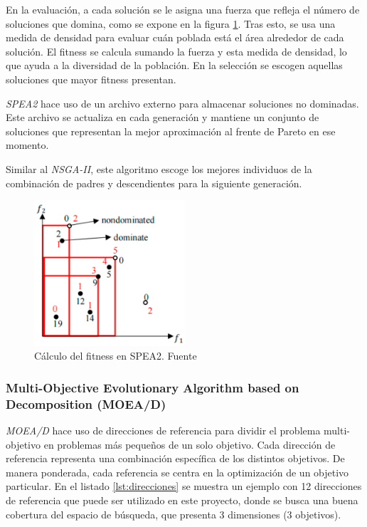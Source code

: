 En la evaluación, a cada solución se le asigna una fuerza que refleja el número de soluciones que domina, como se expone en la figura \ref{fig:spea2}. Tras esto, se usa una medida de densidad para evaluar cuán poblada está el área alrededor de cada solución. El fitness se calcula sumando la fuerza y esta medida de densidad, lo que ayuda a la diversidad de la población. En la selección se escogen aquellas soluciones que mayor fitness presentan.

\textit{SPEA2} hace uso de un archivo externo para almacenar soluciones no dominadas. Este archivo se actualiza en cada generación y mantiene un conjunto de soluciones que representan la mejor aproximación al frente de Pareto en ese momento.

Similar al \textit{NSGA-II}, este algoritmo escoge los mejores individuos de la combinación de padres y descendientes para la siguiente generación.~\cite{pymoo_spea2}

\begin{figure}[H]
  \centering
  \includegraphics[width=0.5\textwidth]{figures/spea2.png}
  \caption{Cálculo del fitness en SPEA2. Fuente \cite{spea2_imagen}}
  \label{fig:spea2}
\end{figure}
\newpage
\subsubsection{Multi-Objective Evolutionary Algorithm based on Decomposition (MOEA/D)}
\label{ch:moead}

\textit{MOEA/D} hace uso de direcciones de referencia para dividir el problema multi-objetivo en problemas más pequeños de un solo objetivo. Cada dirección de referencia representa una combinación específica de los distintos objetivos. De manera ponderada, cada referencia se centra en la optimización de un objetivo particular. En el listado \ref{lst:direcciones} se muestra un ejemplo con 12 direcciones de referencia que puede ser utilizado en este proyecto, donde se busca una buena cobertura del espacio de búsqueda, que presenta 3 dimensiones (3 objetivos).

